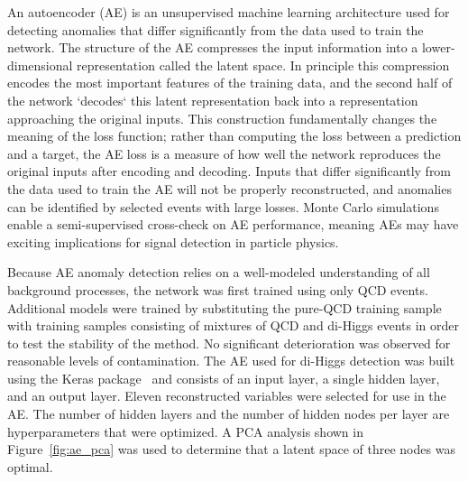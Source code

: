 \label{sec:AE}

An autoencoder (AE) is an unsupervised machine learning architecture used for detecting anomalies that differ significantly from the data used to train the network. The structure of the AE compresses the input information into a lower-dimensional representation called the latent space. In principle this compression encodes the most important features of the training data, and the second half of the network `decodes` this latent representation back into a representation approaching the original inputs. This construction fundamentally changes the meaning of the loss function; rather than computing the loss between a prediction and a target, the AE loss is a measure of how well the network reproduces the original inputs after encoding and decoding. Inputs that differ significantly from the data used to train the AE will not be properly reconstructed, and anomalies can be identified by selected events with large losses. Monte Carlo simulations enable a semi-supervised cross-check on AE performance, meaning AEs may have exciting implications for signal detection in particle physics.

Because AE anomaly detection relies on a well-modeled understanding of all background processes, the network was first trained using only QCD events. Additional models were trained by substituting the pure-QCD training sample with training samples consisting of mixtures of QCD and di-Higgs events in order to test the stability of the method. No significant deterioration was observed for reasonable levels of contamination. The AE used for di-Higgs detection was built using the Keras package~\cite{chollet2015keras} and consists of an input layer, a single hidden layer, and an output layer. Eleven reconstructed variables were selected for use in the AE. The number of hidden layers and the number of hidden nodes per layer are hyperparameters that were optimized. A PCA analysis shown in Figure~\ref{fig:ae_pca} was used to determine that a latent space of three nodes was optimal.


